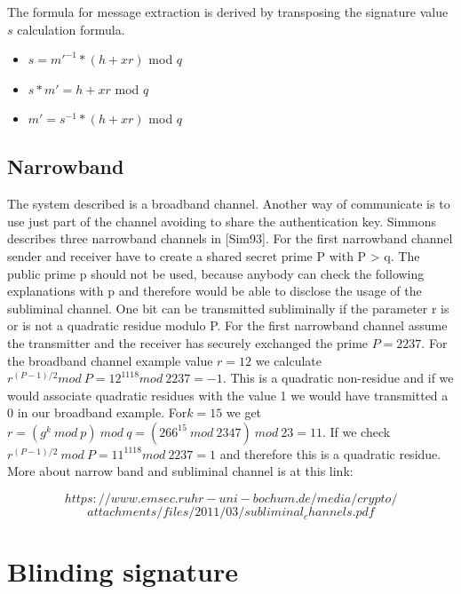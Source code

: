 \documentclass{article}
\begin{document}
The formula for message extraction is derived by transposing the signature value ${ s}$ calculation formula.
\begin{itemize}
    \item ${ s=m'^{-1}*(h+xr)}$ mod ${ q}$
    \item ${ s*m'=h+xr}$ mod ${ q}$
    \item ${ m'=s^{-1}*(h+xr)}$ mod ${ q}$
\end{itemize}
\subsection{Narrowband}
The system described is a broadband channel. Another way of communicate is to use just part of the channel avoiding to share the authentication key. Simmons describes three narrowband channels in [Sim93]. For the first narrowband channel sender and receiver have to create a shared secret prime P with P > q. The public prime p should not be used, because anybody can check the following explanations with p and therefore would be able to disclose the usage of the subliminal channel. One bit can be transmitted subliminally if the parameter r is or is not a quadratic residue modulo P.
For the first narrowband channel assume the transmitter and the receiver has securely exchanged the prime $P = 2237$. For the broadband channel example value $r = 12$ we calculate $r^{(P-1)/2} mod \ P = 12^{1118} mod \ 2237 = -1$. This is a quadratic non-residue and if we would associate quadratic residues with the value 1 we would have transmitted a 0 in our broadband example. For$ k = 15$ we get $r = (g^{k} \ mod \ p) \ mod \ q = (266^{15} \ mod \ 2347)\  mod \ 23 = 11$. If we check $r^{(P-1)/2} \ mod \ P = 11^{1118} mod \ 2237 = 1$ and therefore this is a quadratic residue.
More about narrow band and subliminal channel is at this link:

\[https://www.emsec.ruhr-uni-bochum.de/media/crypto/\]
\[attachments/files/2011/03/subliminal_channels.pdf\]
\section{Blinding signature}
\end{document}
